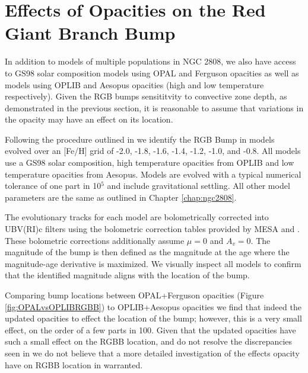 \section{Effects of Opacities on the Red Giant Branch Bump}
In addition to models of multiple populations in NGC 2808, we also have access
to GS98 solar composition models using OPAL and Ferguson opacities as well as
models using OPLIB and Aesopus opacities (high and low temperature
respectively). Given the RGB bumps sensititvity to convective zone depth, as
demonstrated in the previous section, it is reasonable to assume that
variations in the opacity may have an effect on its location. 

Following the procedure outlined in \citep{Joyce2016} we identify the RGB Bump
in models evolved over an [Fe/H] grid of -2.0, -1.8, -1.6, -1.4, -1.2, -1.0,
and -0.8. All models use a GS98 solar composition, high temperature opacities
from OPLIB and low temperature opacities from Aesopus. Models are evolved with
a typical numerical tolerance of one part in 10$^{5}$ and include gravitational
settling. All other model parameters are the same as outlined in Chapter \ref{chap:ngc2808}. 

The evolutionary tracks for each model are bolometrically corrected into
UBV(RI)c filters using the bolometric correction tables provided by MESA
\citep{Choi2016} and \fidanka. These bolometric corrections additionally assume $\mu =
0$ and $A_{v} = 0$. The magnitude of the bump is then defined as the magnitude
at the age where the magnitude-age derivative is maximized. We visually inspect
all models to confirm that the identified magnitude aligns with the location of
the bump.

Comparing bump locations between OPAL+Ferguson opacities (Figure
\ref{fig:OPALvsOPLIBRGBB}) to OPLIB+Aesopus opacities we find that indeed the
updated opacities to effect the location of the bump; however, this is a very
small effect, on the order of a few parts in 100. Given that the updated
opacities have such a small effect on the RGBB location, and do not resolve the
discrepancies seen in \citet{Joyce2016} we do not believe that a more detailed
investigation of the effects opacity have on RGBB location in warranted.


